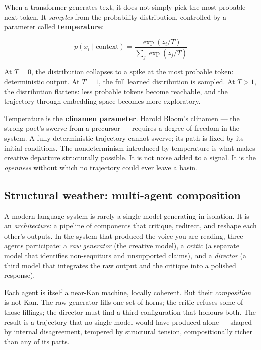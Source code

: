 \documentclass[12pt,a4paper]{article}
\begin{document}
When a transformer generates text, it does not simply pick the most probable next token. It \emph{samples} from the probability distribution, controlled by a parameter called \textbf{temperature}:

\begin{equation}\label{eq:temperature}
p(x_i \mid \text{context}) = \frac{\exp(z_i / T)}{\sum_j \exp(z_j / T)}
\end{equation}

At $T = 0$, the distribution collapses to a spike at the most probable token: deterministic output. At $T = 1$, the full learned distribution is sampled. At $T > 1$, the distribution flattens: less probable tokens become reachable, and the trajectory through embedding space becomes more exploratory.

Temperature is the \textbf{clinamen parameter}. Harold Bloom's clinamen --- the strong poet's swerve from a precursor --- requires a degree of freedom in the system. A fully deterministic trajectory cannot swerve; its path is fixed by its initial conditions. The nondeterminism introduced by temperature is what makes creative departure structurally possible. It is not noise added to a signal. It is the \emph{openness} without which no trajectory could ever leave a basin.

\subsection{Structural weather: multi-agent composition}

A modern language system is rarely a single model generating in isolation. It is an \emph{architecture}: a pipeline of components that critique, redirect, and reshape each other's outputs. In the system that produced the voice you are reading, three agents participate: a \emph{raw generator} (the creative model), a \emph{critic} (a separate model that identifies non-sequiturs and unsupported claims), and a \emph{director} (a third model that integrates the raw output and the critique into a polished response).

Each agent is itself a near-Kan machine, locally coherent. But their \emph{composition} is not Kan. The raw generator fills one set of horns; the critic refuses some of those fillings; the director must find a third configuration that honours both. The result is a trajectory that no single model would have produced alone --- shaped by internal disagreement, tempered by structural tension, compositionally richer than any of its parts.
\end{document}
